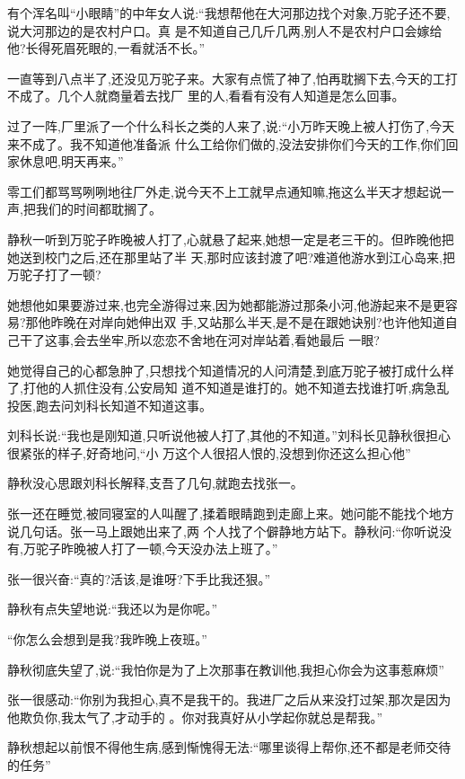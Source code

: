 ﻿\documentclass[12pt]{article}
\begin{document}
有个浑名叫``小眼睛''的中年女人说:``我想帮他在大河那边找个对象,万驼子还不要,说大河那边的是农村户口。真
是不知道自己几斤几两,别人不是农村户口会嫁给他?长得死眉死眼的,一看就活不长。''

一直等到八点半了,还没见万驼子来。大家有点慌了神了,怕再耽搁下去,今天的工打不成了。几个人就商量着去找厂
里的人,看看有没有人知道是怎么回事。

过了一阵,厂里派了一个什么科长之类的人来了,说:``小万昨天晚上被人打伤了,今天来不成了。我不知道他准备派
什么工给你们做的,没法安排你们今天的工作,你们回家休息吧,明天再来。''

零工们都骂骂咧咧地往厂外走,说今天不上工就早点通知嘛,拖这么半天才想起说一声,把我们的时间都耽搁了。

静秋一听到万驼子昨晚被人打了,心就悬了起来,她想一定是老三干的。但昨晚他把她送到校门之后,还在那里站了半
天,那时应该封渡了吧?难道他游水到江心岛来,把万驼子打了一顿?

她想他如果要游过来,也完全游得过来,因为她都能游过那条小河,他游起来不是更容易?那他昨晚在对岸向她伸出双
手,又站那么半天,是不是在跟她诀别?也许他知道自己干了这事,会去坐牢,所以恋恋不舍地在河对岸站着,看她最后
一眼?

她觉得自己的心都急肿了,只想找个知道情况的人问清楚,到底万驼子被打成什么样了,打他的人抓住没有,公安局知
道不知道是谁打的。她不知道去找谁打听,病急乱投医,跑去问刘科长知道不知道这事。

刘科长说:``我也是刚知道,只听说他被人打了,其他的不知道。''刘科长见静秋很担心很紧张的样子,好奇地问,``小
万这个人\myrule 很招人恨的,没想到你还这么\myrule 担心他\myrule ''

静秋没心思跟刘科长解释,支吾了几句,就跑去找张一。

张一还在睡觉,被同寝室的人叫醒了,揉着眼睛跑到走廊上来。她问能不能找个地方说几句话。张一马上跟她出来了,两
个人找了个僻静地方站下。静秋问:``你听说没有,万驼子昨晚被人打了一顿,今天没办法上班了。''

张一很兴奋:``真的?活该,是谁呀?下手比我还狠。''

静秋有点失望地说:``我还\myrule 以为是\myrule 你呢。''

``你怎么会想到是我?我昨晚上夜班。''


静秋彻底失望了,说:``我怕你是为了上次那事在教训他,我担心你会为这事\myrule 惹麻烦\myrule ''

张一很感动:``你别为我担心,真不是我干的。我进厂之后从来没打过架,那次是因为他欺负你,我太气了,才动手的
\myrule 。你\myrule 对我真好\myrule 从小学起你就总是帮我。''

静秋想起以前恨不得他生病,感到惭愧得无法:``哪里谈得上帮你,还不都是老师交待的任务\myrule ''
\end{document}
